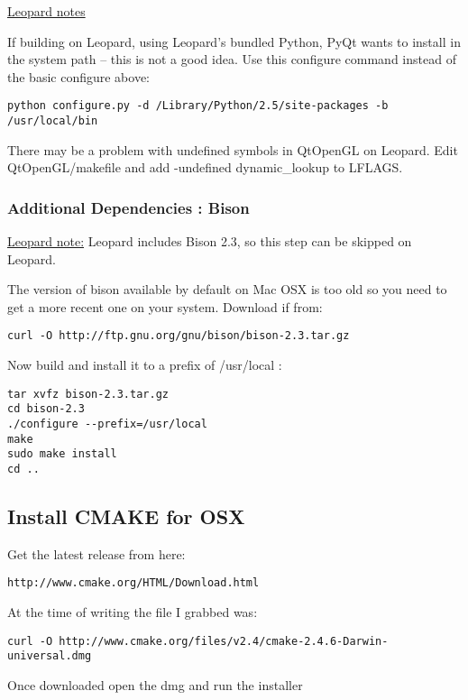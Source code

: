 \underline{Leopard notes}

If building on Leopard, using Leopard's bundled Python, PyQt wants to install in the system path -- this is not a good idea.  Use this configure command instead of the basic configure above:

\begin{verbatim}
python configure.py -d /Library/Python/2.5/site-packages -b /usr/local/bin
\end{verbatim}

There may be a problem with undefined symbols in QtOpenGL on Leopard.  Edit QtOpenGL/makefile and add -undefined dynamic\_lookup to LFLAGS.

\subsubsection{Additional Dependencies : Bison}
\underline{Leopard note:} Leopard includes Bison 2.3, so this step can be skipped on Leopard.

The version of bison available by default on Mac OSX is too old so you need to
get a more recent one on your system. Download if from:

\begin{verbatim}
curl -O http://ftp.gnu.org/gnu/bison/bison-2.3.tar.gz 
\end{verbatim}

Now build and install it to a prefix of /usr/local :

\begin{verbatim}
tar xvfz bison-2.3.tar.gz 
cd bison-2.3 
./configure --prefix=/usr/local 
make
sudo make install 
cd ..  
\end{verbatim}

\subsection{Install CMAKE for OSX}
Get the latest release from here:

\begin{verbatim}
http://www.cmake.org/HTML/Download.html 
\end{verbatim}

At the time of writing the file I grabbed was:

\begin{verbatim}
curl -O http://www.cmake.org/files/v2.4/cmake-2.4.6-Darwin-universal.dmg
\end{verbatim}

Once downloaded open the dmg and run the installer

